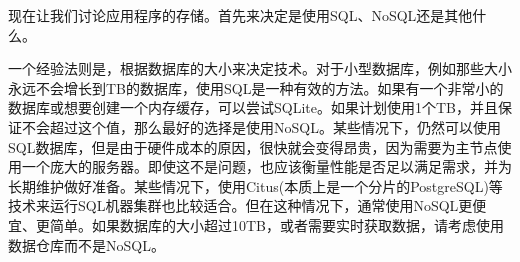 现在让我们讨论应用程序的存储。首先来决定是使用SQL、NoSQL还是其他什么。

一个经验法则是，根据数据库的大小来决定技术。对于小型数据库，例如那些大小永远不会增长到TB的数据库，使用SQL是一种有效的方法。如果有一个非常小的数据库或想要创建一个内存缓存，可以尝试SQLite。如果计划使用1个TB，并且保证不会超过这个值，那么最好的选择是使用NoSQL。某些情况下，仍然可以使用SQL数据库，但是由于硬件成本的原因，很快就会变得昂贵，因为需要为主节点使用一个庞大的服务器。即使这不是问题，也应该衡量性能是否足以满足需求，并为长期维护做好准备。某些情况下，使用Citus(本质上是一个分片的PostgreSQL)等技术来运行SQL机器集群也比较适合。但在这种情况下，通常使用NoSQL更便宜、更简单。如果数据库的大小超过10TB，或者需要实时获取数据，请考虑使用数据仓库而不是NoSQL。